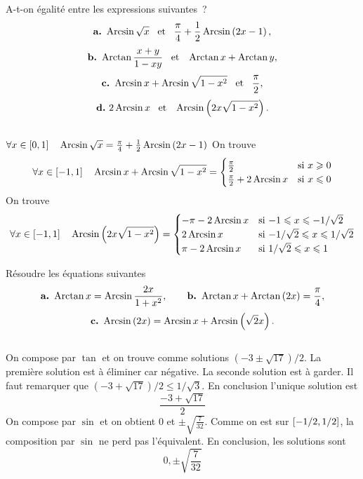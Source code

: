 \documentclass{magnolia}
\begin{document}

A-t-on égalité entre les expressions suivantes~?
$$\textbf{a.}\ \operatorname{Arcsin}\sqrt{x} \quad\!\text{et}\quad\! \frac{\pi}{4}+\frac{1}{2}\operatorname{Arcsin}\left(2x-1\right),$$
$$\textbf{b.}\ \operatorname{Arctan}\frac{x+y}{1-xy} \quad\!\text{et}\quad\! \operatorname{Arctan} x+\operatorname{Arctan} y,$$
$$\textbf{c.}\ \operatorname{Arcsin} x+\operatorname{Arcsin}\sqrt{1-x^2} \quad\!\text{et}\quad\! \frac{\pi}{2},$$
$$\textbf{d.}\ 2\operatorname{Arcsin} x \quad\!\text{et}\quad\! \operatorname{Arcsin}\left(2x\sqrt{1-x^2}\right).$$
\begin{sol}
$\quad$
\begin{questions}
\question $\forall x\in\left[0,1\right] \quad
  \operatorname{Arcsin}\sqrt{x}=\frac{\pi}{4}+\frac{1}{2}\operatorname{Arcsin}\left(2x-1\right)$
\question
\question On trouve
  \[\forall x\in\left[-1,1\right] \quad \operatorname{Arcsin} x+\operatorname{Arcsin}\sqrt{1-x^2}=
    \begin{cases}
    \frac{\pi}{2} & \text{si $x\geqslant 0$}\\
    \frac{\pi}{2}+2\operatorname{Arcsin} x & \text{si $x\leqslant 0$}
    \end{cases}\]
\question On trouve
  \[\forall x\in\left[-1,1\right] \quad \operatorname{Arcsin}\left(2x\sqrt{1-x^2}\right)=
    \begin{cases}
    -\pi-2\operatorname{Arcsin} x & \text{si $-1\leqslant x \leqslant -1/\sqrt{2}$}\\
    2\operatorname{Arcsin} x & \text{si $-1/\sqrt{2}\leqslant x\leqslant 1/\sqrt{2}$}\\
    \pi-2\operatorname{Arcsin} x & \text{si $1/\sqrt{2}\leqslant x \leqslant 1$}
    \end{cases}\]
\end{questions}
\end{sol}



Résoudre les équations suivantes
$$\textbf{a.}\ \operatorname{Arctan} x=\operatorname{Arcsin}\frac{2x}{1+x^2}, \qquad \textbf{b.}\ \operatorname{Arctan} x+\operatorname{Arctan}\left(2x\right)=\frac{\pi}{4},$$
$$\textbf{c.}\ \arcsin\p{2x}=\arcsin{x}+\arcsin\p{\sqrt{2}x}.$$

\begin{sol}
$\quad$
\begin{questions}
\question On compose par $\tan$ et on trouve comme solutions $(-3\pm\sqrt{17})/2$.
  La première solution est à éliminer car négative. La seconde solution
  est à garder. Il faut remarquer que $(-3+\sqrt{17})/2\leq1/\sqrt{3}$.
  En conclusion l'unique solution est
  \[\frac{-3+\sqrt{17}}{2}\]
\question On compose par $\sin$ et on obtient 0 et $\pm \sqrt{\frac{7}{32}}$.
  Comme on est sur $\left[-1/2,1/2\right]$, la composition par $\sin$ ne perd pas
  l'équivalent. En conclusion, les solutions sont
  \[0,\pm\sqrt{\frac{7}{32}}\]
\end{questions}
\end{sol}
\end{document}
